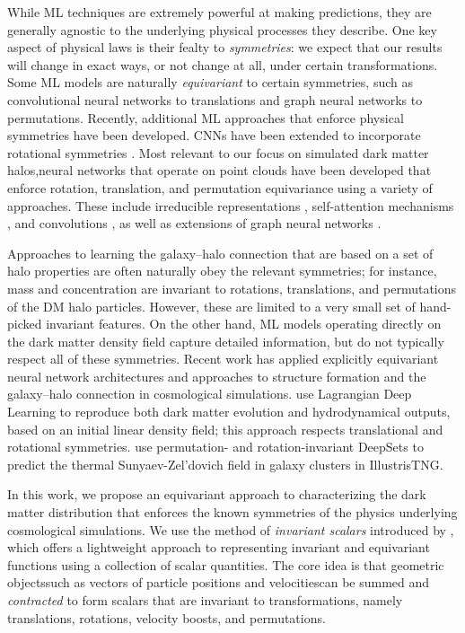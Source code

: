 While ML techniques are extremely powerful at making predictions, they are generally agnostic to the underlying physical processes they describe.
One key aspect of physical laws is their fealty to \emph{symmetries}: we expect that our results will change in exact ways, or not change at all, under certain transformations.
Some ML models are naturally \emph{equivariant} to certain symmetries, such as convolutional neural networks to translations and graph neural networks to permutations.
Recently, additional ML approaches that enforce physical symmetries have been developed.
CNNs have been extended to incorporate rotational symmetries \citep{cohen2019gauge,wang2021incorporating,ocampo_scalable_2023}.
Most relevant to our focus on simulated dark matter halos,neural networks that operate on point clouds have been developed that enforce rotation, translation, and permutation equivariance using a variety of approaches.
These include irreducible representations \citep{thomas2018tensor}, self-attention mechanisms \citep{fuchs2020se}, and convolutions \citep{kondor2018covariant,zhang2019rotation}, as well as extensions of graph neural networks \citep{Satorras2021}.

Approaches to learning the galaxy--halo connection that are based on a set of halo properties are often naturally obey the relevant symmetries; for instance, mass and concentration are invariant to rotations, translations, and permutations of the DM halo particles.
However, these are limited to a very small set of hand-picked invariant features.
On the other hand, ML models operating directly on the dark matter density field capture detailed information, but do not typically respect all of these symmetries.
Recent work has applied explicitly equivariant neural network architectures and approaches to structure formation and the galaxy--halo connection in cosmological simulations.
\cite{dai_learning_2020} use Lagrangian Deep Learning to reproduce both dark matter evolution and hydrodynamical outputs, based on an initial linear density field; this approach respects translational and rotational symmetries.
\cite{thiele_predicting_2022} use permutation- and rotation-invariant DeepSets to predict the thermal Sunyaev-Zel'dovich field in galaxy clusters in IllustrisTNG.

In this work, we propose an equivariant approach to characterizing the dark matter distribution that enforces the known symmetries of the physics underlying cosmological simulations. 
We use the method of \emph{invariant scalars} introduced by \cite{Villar2021a}, which offers a lightweight approach to representing invariant and equivariant functions using a collection of scalar quantities.
The core idea is that geometric objects{\emdash}such as vectors of particle positions and velocities{\emdash}can be summed and \emph{contracted} to form scalars that are invariant to transformations, namely translations, rotations, velocity boosts, and permutations.

